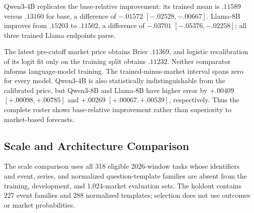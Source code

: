 \begin{center}
\begin{minipage}{.94\linewidth}
\centering
{}
\label{tab:exp4-endpoint-results}
\scriptsize
\setlength{\tabcolsep}{3.5pt}
\resizebox{\linewidth}{!}{}
\end{minipage}
\end{center}

\begin{center}
\begin{minipage}{.9\linewidth}
\centering
{}
\label{tab:exp3b-model-roster-results}
\scriptsize
\setlength{\tabcolsep}{3.5pt}
\resizebox{\linewidth}{!}{%

}
\end{minipage}
\end{center}

Qwen3-4B replicates the base-relative improvement: its trained mean is $.11589$
versus $.13160$ for base, a difference of $-.01572$
$[-.02528,-.00667]$. Llama-8B improves from $.15203$ to $.11502$, a difference
of $-.03701$ $[-.05376,-.02258]$; all three trained Llama endpoints parse.

The latest pre-cutoff market price obtains Brier $.11369$, and logistic
recalibration of its logit fit only on the training split obtains $.11232$.
Neither comparator informs language-model training. The trained-minus-market
interval spans zero for every model. Qwen3-4B is also statistically
indistinguishable from the calibrated price, but Qwen3-8B and Llama-8B have
higher error by $+.00409$ $[+.00098,+.00785]$ and $+.00269$
$[+.00067,+.00539]$, respectively. Thus the complete roster shows
base-relative improvement rather than superiority to market-based forecasts.

\subsection{Scale and Architecture Comparison}
\label{app:exp4-scale}

The scale comparison uses all 318 eligible 2026-window tasks whose identifiers and
event, series, and normalized question-template families are absent from the
training, development, and 1,024-market evaluation sets. The holdout contains 227
event families and 288 normalized templates; selection does not use outcomes or
market probabilities.

